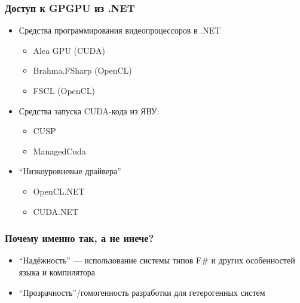\documentclass[xcolor=table]{beamer}
\begin{document}
\begin{frame}[fragile]
  \transwipe[direction=90]
  \frametitle{Доступ к GPGPU из .NET}
  \begin{itemize}
  \item Средства программирования видеопроцессоров в .NET
  \begin{itemize}
     \item Alea GPU (CUDA)
     \item Brahma.FSharp (OpenCL)
     \item FSCL (OpenCL)
  \end{itemize}
  \item Средства запуска CUDA-кода из ЯВУ:
  \begin{itemize}
     \item CUSP
     \item ManagedCuda
  \end{itemize}
  \item ``Низкоуровневые драйвера''
  \begin{itemize}
     \item OpenCL.NET
     \item CUDA.NET
  \end{itemize}
  \end{itemize}
\end{frame}


\begin{frame}[fragile]
  \transwipe[direction=90]
  \frametitle{Почему именно так, а не инече?}
      \begin{itemize}
        \item ``Надёжность'' --- использование системы типов F\# и других особенностей языка и компилятора
        \item ``Прозрачность''/гомогенность разработки для гетерогенных систем
      \end{itemize}
\end{frame}
\end{document}

